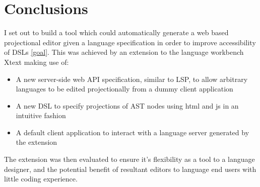 \documentclass{article}
\begin{document}
\section{Conclusions}\label{conclusion}
I set out to build a tool which could automatically generate a web based projectional editor given a language specification in order to improve accessibility of DSLs \ref{goal}. This was achieved by an extension to the language workbench Xtext making use of:
\begin{itemize}
\item{A new server-side web API specification, similar to LSP, to allow arbitrary languages to be edited projectionally from a dummy client application}
\item{A new DSL to specify projections of AST nodes using html and js in an intuitive fashion}
\item{A default client application to interact with a language server generated by the extension}
\end{itemize}
The extension was then evaluated to ensure it's flexibility as a tool to a language designer, and the potential benefit of resultant editors to language end users with little coding experience.
\end{document}
